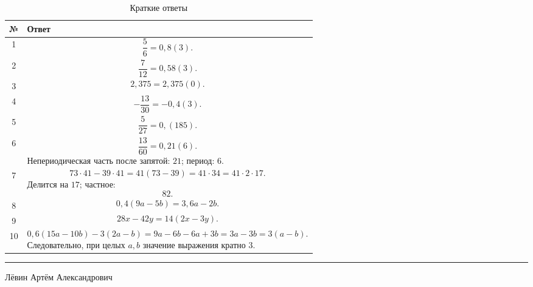 \documentclass[a4paper,12pt]{article}
\begin{document}
\begin{table}[ht]
\centering
\caption{Краткие ответы}
\begin{tabularx}{\linewidth}{@{}cX@{}}
\toprule
\textbf{№} & \textbf{Ответ} \\
\midrule

1 &
\[
\frac56=0,8(3).
\]
\\

2 &
\[
\frac7{12}=0,58(3).
\]
\\

3 &
\[
2,375=2,375(0).
\]
\\

4 &
\[
-\frac{13}{30}=-0,4(3).
\]
\\

5 &
\[
\frac5{27}=0,(185).
\]
\\

6 &
\[
\frac{13}{60}=0,21(6).
\]
Непериодическая часть после запятой: \(21\);
период: \(6\).
\\

7 &
\[
73\cdot41-39\cdot41
=
41(73-39)
=
41\cdot34
=
41\cdot2\cdot17.
\]
Делится на \(17\); частное:
\[
82.
\]
\\

8 &
\[
0,4(9a-5b)=3,6a-2b.
\]
\\

9 &
\[
28x-42y=14(2x-3y).
\]
\\

10 &
\[
0,6(15a-10b)-3(2a-b)
=
9a-6b-6a+3b
=
3a-3b
=
3(a-b).
\]
Следовательно, при целых \(a,b\) значение выражения кратно \(3\).
\\

\bottomrule
\end{tabularx}
\end{table}

\vfill

\begin{center}
\textcolor{accent}{\rule{0.65\linewidth}{0.7pt}}

\vspace{0.5em}

{\small
Лёвин Артём Александрович
}
\end{center}
\end{document}
